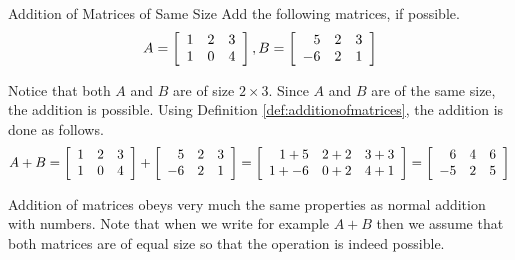 \begin{example}{Addition of Matrices of Same Size}\label{exa:samesizematrixaddition}
Add the following matrices, if possible.
\begin{equation*}
A = \left[
\begin{array}{ccc}
1 & 2 & 3 \\
1 & 0 & 4
\end{array}
\right],
B = \left[
\begin{array}{rrr}
5 & 2 & 3 \\
-6 & 2 & 1
\end{array}
\right]
\end{equation*}
\end{example}

\begin{solution}
Notice that both $A$ and $B$ are of size $2 \times 3$. 
Since $A$ and $B$ are of the same size, the addition is possible. Using Definition \ref{def:additionofmatrices}, 
the addition is done as follows. 
\begin{equation*}
A + B = \left[
\begin{array}{rrr}
1 & 2 & 3 \\
1 & 0 & 4
\end{array}
\right]
+
\left[
\begin{array}{rrr}
5 & 2 & 3 \\
-6 & 2 & 1
\end{array}
\right]
=\allowbreak 
\left[
\begin{array}{rrr}
1+5 & 2+2 & 3+3 \\
1+ -6 & 0+2 & 4+1
\end{array}
\right]
=
\left[
\begin{array}{rrr}
6 & 4 & 6 \\
-5 & 2 & 5
\end{array}
\right]
\end{equation*}
\end{solution}

Addition of matrices obeys very much the same properties as normal
addition with numbers. Note that when we write for example $A+B$ then
we assume that both matrices are of equal size so that the operation
is indeed possible.

